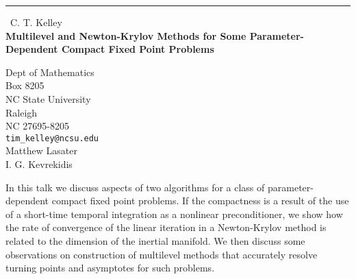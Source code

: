 \documentclass{report}
\begin{document}
\begin{center}
\rule{6in}{1pt} \
{\large C. T. Kelley \\
{\bf Multilevel and Newton-Krylov Methods for Some Parameter-Dependent Compact Fixed Point Problems}}

Dept of Mathematics \\ Box 8205 \\ NC State University \\ Raleigh \\ NC 27695-8205
\\
{\tt tim_kelley@ncsu.edu}\\
Matthew Lasater\\
I. G. Kevrekidis\end{center}

In this talk we discuss aspects of two algorithms for
a class of parameter-dependent
compact fixed point problems. If the compactness is a result
of the use of a short-time temporal integration as a nonlinear
preconditioner, we show how the rate of convergence of the
linear iteration in a Newton-Krylov method is related to the
dimension of the inertial manifold. We then
discuss some observations on construction of multilevel methods
that accurately resolve turning points and asymptotes for such
problems.
\end{document}
